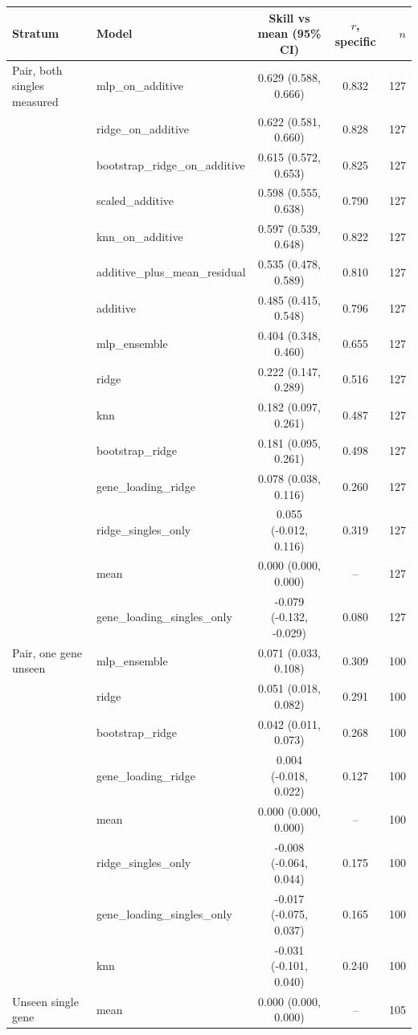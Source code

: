 \begin{tabular}{llccr}
\toprule
Stratum & Model & Skill vs mean (95\% CI) & $r$, specific & $n$ \\
\midrule
Pair, both singles measured & mlp\_on\_additive & 0.629 (0.588, 0.666) & 0.832 & 127 \\
 & ridge\_on\_additive & 0.622 (0.581, 0.660) & 0.828 & 127 \\
 & bootstrap\_ridge\_on\_additive & 0.615 (0.572, 0.653) & 0.825 & 127 \\
 & scaled\_additive & 0.598 (0.555, 0.638) & 0.790 & 127 \\
 & knn\_on\_additive & 0.597 (0.539, 0.648) & 0.822 & 127 \\
 & additive\_plus\_mean\_residual & 0.535 (0.478, 0.589) & 0.810 & 127 \\
 & additive & 0.485 (0.415, 0.548) & 0.796 & 127 \\
 & mlp\_ensemble & 0.404 (0.348, 0.460) & 0.655 & 127 \\
 & ridge & 0.222 (0.147, 0.289) & 0.516 & 127 \\
 & knn & 0.182 (0.097, 0.261) & 0.487 & 127 \\
 & bootstrap\_ridge & 0.181 (0.095, 0.261) & 0.498 & 127 \\
 & gene\_loading\_ridge & 0.078 (0.038, 0.116) & 0.260 & 127 \\
 & ridge\_singles\_only & 0.055 (-0.012, 0.116) & 0.319 & 127 \\
 & mean & 0.000 (0.000, 0.000) & -- & 127 \\
 & gene\_loading\_singles\_only & -0.079 (-0.132, -0.029) & 0.080 & 127 \\
Pair, one gene unseen & mlp\_ensemble & 0.071 (0.033, 0.108) & 0.309 & 100 \\
 & ridge & 0.051 (0.018, 0.082) & 0.291 & 100 \\
 & bootstrap\_ridge & 0.042 (0.011, 0.073) & 0.268 & 100 \\
 & gene\_loading\_ridge & 0.004 (-0.018, 0.022) & 0.127 & 100 \\
 & mean & 0.000 (0.000, 0.000) & -- & 100 \\
 & ridge\_singles\_only & -0.008 (-0.064, 0.044) & 0.175 & 100 \\
 & gene\_loading\_singles\_only & -0.017 (-0.075, 0.037) & 0.165 & 100 \\
 & knn & -0.031 (-0.101, 0.040) & 0.240 & 100 \\
Unseen single gene & mean & 0.000 (0.000, 0.000) & -- & 105 \\

\end{tabular}
